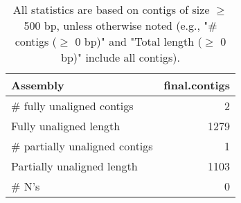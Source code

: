 \documentclass[12pt,a4paper]{article}
\begin{document}
\begin{table}[ht]
\begin{center}
\caption{All statistics are based on contigs of size $\geq$ 500 bp, unless otherwise noted (e.g., "\# contigs ($\geq$ 0 bp)" and "Total length ($\geq$ 0 bp)" include all contigs).}
\begin{tabular}{|l*{1}{|r}|}
\hline
Assembly & final.contigs \\ \hline
\# fully unaligned contigs & 2 \\ \hline
Fully unaligned length & 1279 \\ \hline
\# partially unaligned contigs & 1 \\ \hline
Partially unaligned length & 1103 \\ \hline
\# N's & 0 \\ \hline
\end{tabular}
\end{center}
\end{table}
\end{document}
